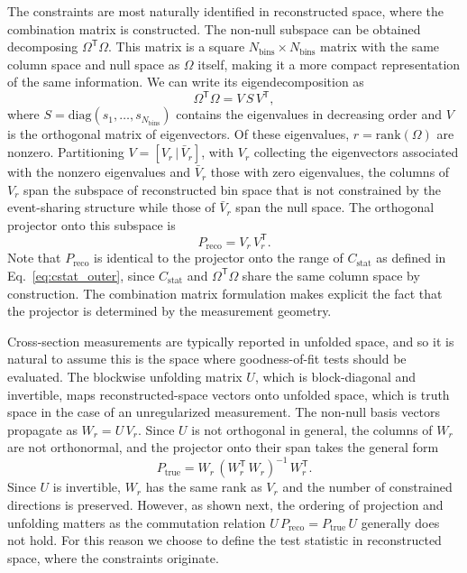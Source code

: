 \documentclass[a4paper,11pt]{article}
\begin{document}
The constraints are most naturally identified in reconstructed space, where the combination matrix is constructed. The non-null subspace can be obtained decomposing $\Omega^{\mathsf{T}} \Omega$. This matrix is a square $N_{\text{bins}} \times N_{\text{bins}}$ matrix with the same column space and null space as $\Omega$ itself, making it a more compact representation of the same information. We can write its eigendecomposition as
\begin{equation}\label{eq:oto_svd}
    \Omega^{\mathsf{T}} \Omega = V \, S \, V^{\mathsf{T}},
\end{equation}
where $S = \mathrm{diag}(s_{1}, \ldots, s_{N_{\text{bins}}})$ contains the eigenvalues in decreasing order and $V$ is the orthogonal matrix of eigenvectors. Of these eigenvalues, $r = \mathrm{rank}(\Omega)$ are nonzero. Partitioning $V = [V_{r} \, | \, \bar{V}_{r}]$, with $V_{r}$ collecting the eigenvectors associated with the nonzero eigenvalues and $\bar{V}_{r}$ those with zero eigenvalues, the columns of $V_{r}$ span the subspace of reconstructed bin space that is not constrained by the event-sharing structure while those of $\bar{V}_{r}$ span the null space. The orthogonal projector onto this subspace is
\begin{equation}\label{eq:proj_reco}
    P_{\text{reco}} = V_{r} \, V_{r}^{\mathsf{T}}.
\end{equation}
Note that $P_{\text{reco}}$ is identical to the projector onto the range of $C_{\text{stat}}$ as defined in Eq.~\eqref{eq:cstat_outer}, since $C_{\text{stat}}$ and $\Omega^{\mathsf{T}} \Omega$ share the same column space by construction. The combination matrix formulation makes explicit the fact that the projector is determined by the measurement geometry.

Cross-section measurements are typically reported in unfolded space, and so it is natural to assume this is the space where goodness-of-fit tests should be evaluated. The blockwise unfolding matrix $U$, which is block-diagonal and invertible, maps reconstructed-space vectors onto unfolded space, which is truth space in the case of an unregularized measurement. The non-null basis vectors propagate as $W_{r} = U \, V_{r}$. Since $U$ is not orthogonal in general, the columns of $W_{r}$ are not orthonormal, and the projector onto their span takes the general form
\begin{equation}\label{eq:proj_true}
    P_{\text{true}} = W_{r} \, (W_{r}^{\mathsf{T}} \, W_{r})^{-1} \, W_{r}^{\mathsf{T}}.
\end{equation}
Since $U$ is invertible, $W_{r}$ has the same rank as $V_{r}$ and the number of constrained directions is preserved. However, as shown next, the ordering of projection and unfolding matters as the commutation relation $U \, P_{\text{reco}} = P_{\text{true}} \, U$ generally does not hold. For this reason we choose to define the test statistic in reconstructed space, where the constraints originate.
\end{document}
